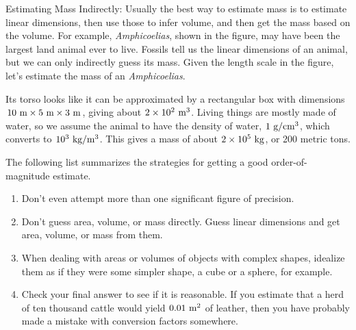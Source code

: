 \begin{exmp}\label{eg:amphicoelias}
Estimating Mass Indirectly: Usually the best way to estimate mass is to estimate linear dimensions, then use those to infer volume, and then get the mass based on the volume.
For example, \emph{Amphicoelias}, shown in the figure, may have been the largest
land animal ever to live. Fossils tell us the linear dimensions of an animal,
but we can only indirectly guess its mass. Given the length scale in the figure,
let's estimate the mass of an \emph{Amphicoelias}.

Its torso looks like it can be approximated by a rectangular box with dimensions
$10\ \munit\times5\ \munit\times3\ \munit$, giving about $2\times10^2\ \munit^3$. Living things
are mostly made of water, so we assume the animal to have the density of water,
$1\ \zu{g}/\zu{cm}^3$, which converts to $10^3\ \textup{kg}/\textup{m}^3$. This
gives a mass of about $2\times10^5\ \textup{kg}$, or 200 metric tons.
\end{exmp}
\divider
\vspace{2mm}

\piccaption{ \qquad }

The following list summarizes the strategies for getting a
good order-of-magnitude estimate.

\begin{enumerate}
\item Don't even attempt more than one significant figure of precision.

\item Don't guess area, volume, or mass directly. Guess linear
dimensions and get area, volume, or mass from them.

\item When dealing with areas or volumes of objects with
complex shapes, idealize them as if they were some simpler
shape, a cube or a sphere, for example.

\item Check your final answer to see if it is reasonable. If
you estimate that a herd of ten thousand cattle would yield
$0.01\ \textup{m}^2$ of leather, then you have probably made a mistake
with conversion factors somewhere.
\end{enumerate}



